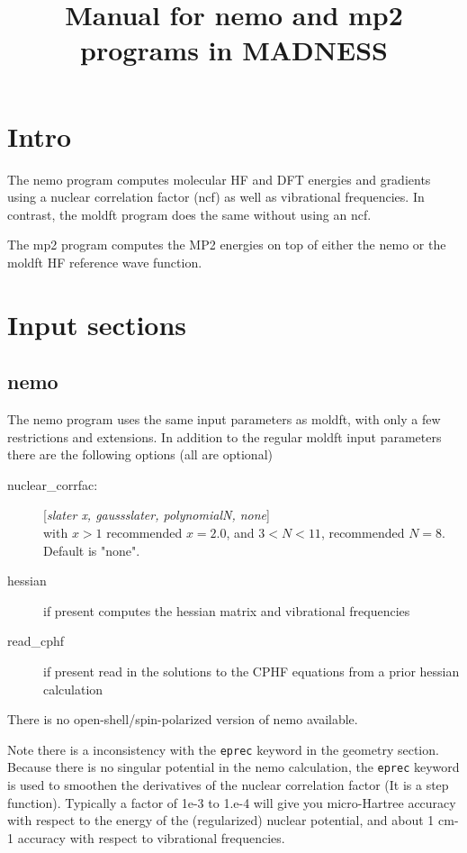 \documentclass[10pt]{article}
\title{Manual for nemo and mp2 programs in MADNESS}
\begin{document}
\maketitle{}

\section{Intro}
The nemo program computes molecular HF and DFT energies and gradients using a nuclear correlation factor (ncf) as well as vibrational frequencies.\cite{Bischoff:2014du} 
In contrast, the moldft program does the same without using an ncf.

The mp2 program computes the MP2 energies on top of either the nemo or the moldft HF reference wave function.\cite{Bischoff:2014ky,Bischoff:2013cx}

\section{Input sections}
\subsection{nemo}
The nemo program uses the same input parameters as moldft, with only a few restrictions and extensions.
In addition to the regular moldft input parameters there are the following options (all are optional)
\begin{description}
\item[nuclear\_corrfac:]	[\textit{slater x, gaussslater, polynomialN, none}]\\
with $x>1$ recommended $x=2.0$, and  $3<N<11$, recommended $N=8$. Default is "{}none"{}.
\item[hessian] if present computes the hessian matrix and vibrational frequencies
\item[read\_cphf] if present read in the solutions to the CPHF equations from a prior hessian calculation
\end{description}
There is no open-shell/spin-polarized version of nemo available.

Note there is a inconsistency with the \texttt{eprec} keyword in the geometry section. 
Because there is no singular potential in the nemo calculation, the \texttt{eprec} keyword is used to smoothen the derivatives of the nuclear correlation factor (It is a step function).
Typically a factor of 1e-3 to 1.e-4 will give you micro-Hartree accuracy with respect to the energy of the (regularized) nuclear potential, and about 1 cm-1 accuracy with respect to vibrational frequencies.
\end{document}
